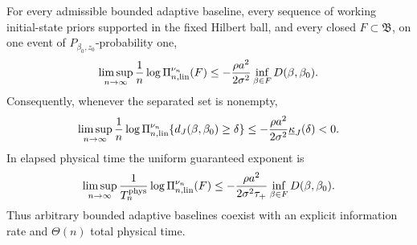 \begin{theorem}
\label{thm:linear-time-adaptive-jacobi}
For every admissible bounded adaptive baseline, every sequence of working
initial-state priors supported in the fixed Hilbert ball, and every closed
\(F\subset\mathfrak B\), on one event of
\(P_{\beta_0,z_0}\)-probability one,
\begin{equation}
 \limsup_{n\to\infty}\frac1n
 \log\Pi_{n,{\rm lin}}^{\nu_n}(F)
 \le-\frac{\rho a^2}{2\sigma^2}
       \inf_{\beta\in F}D(\beta,\beta_0).
 \label{eq:linear-posterior-upper}
\end{equation}
Consequently, whenever the separated set is nonempty,
\begin{equation}
 \limsup_{n\to\infty}\frac1n
 \log\Pi_{n,{\rm lin}}^{\nu_n}
 \{d_J(\beta,\beta_0)\ge\delta\}
 \le-\frac{\rho a^2}{2\sigma^2}
       \underline\kappa_J(\delta)<0.
 \label{eq:linear-coefficient-upper}
\end{equation}
In elapsed physical time the uniform guaranteed exponent is
\begin{equation}
 \limsup_{n\to\infty}\frac1{T_n^{\rm phys}}
 \log\Pi_{n,{\rm lin}}^{\nu_n}(F)
 \le-\frac{\rho a^2}{2\sigma^2\tau_+}
       \inf_{\beta\in F}D(\beta,\beta_0).
 \label{eq:linear-elapsed-rate}
\end{equation}
Thus arbitrary bounded adaptive baselines coexist with an explicit
information rate and \(\Theta(n)\) total physical time.
\end{theorem}

